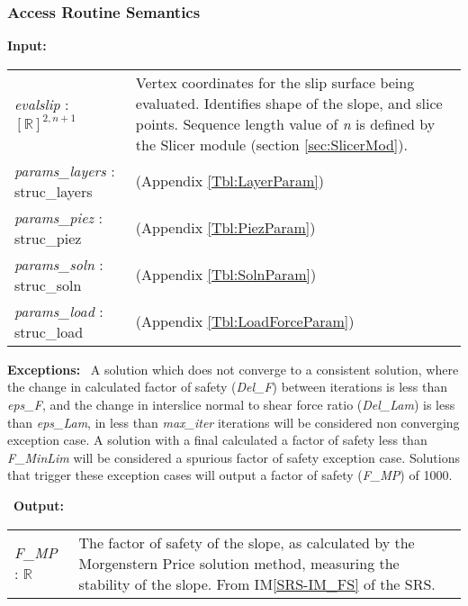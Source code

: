 \documentclass[12pt, titlepage]{article}
\begin{document}
\subsubsection{Access Routine Semantics}

\textbf{Input:} 
\renewcommand*{\arraystretch}{1.5}
\begin{longtable}{p{} p{}}
  \textit{evalslip} : $[\mathbb{R}]^{2,n+1}$ & Vertex coordinates for
  the slip surface being evaluated. Identifies shape of the slope, and
  slice points. Sequence length value of \textit{n} is defined by the
  Slicer module (section \ref{sec:SlicerMod}).\\

  \textit{params\_layers} : struc\_layers & (Appendix
  \ref{Tbl:LayerParam})\\

  \textit{params\_piez} : struc\_piez & (Appendix
  \ref{Tbl:PiezParam})\\

  \textit{params\_soln} : struc\_soln & (Appendix
  \ref{Tbl:SolnParam})\\

  \textit{params\_load} : struc\_load & (Appendix
  \ref{Tbl:LoadForceParam})
\end{longtable}

\noindent \textbf{Exceptions:} ~\newline\noindent A solution which
does not converge to a consistent solution, where the change in
calculated factor of safety (\textit{Del\_F}) between iterations is
less than \textit{eps\_F}, and the change in interslice normal to
shear force ratio (\textit{Del\_Lam}) is less than \textit{eps\_Lam},
in less than \textit{max\_iter} iterations will be considered non
converging exception case. A solution with a final calculated a factor
of safety less than \textit{F\_MinLim} will be considered a spurious
factor of safety exception case. Solutions that trigger these
exception cases will output a factor of safety (\textit{F\_MP}) of
1000.

~\newline\noindent \textbf{Output:}
\renewcommand*{\arraystretch}{1.5}
\begin{longtable}{p{} p{}}
  \textit{F\_MP} : $\mathbb{R}$ & The factor of safety of the slope,
  as calculated by the Morgenstern Price solution method, measuring
  the stability of the slope. From IM\ref{SRS-IM_FS} of the SRS.\\
\end{longtable}
\end{document}
